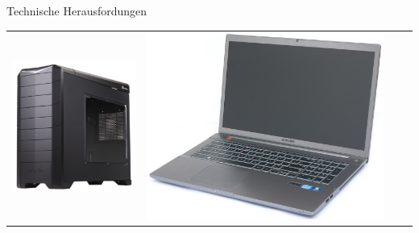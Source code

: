 \begin{frame}{Technische Herausfordungen}
\onetoone
{
	\begin{table}[h]
	\begin{tabular}{c|c|c|c}
		\includegraphics[width=\textwidth, height=0.1\textheight, keepaspectratio]{images/tower} &
		\includegraphics[width=\textwidth, height=0.1\textheight, keepaspectratio]{images/laptops} &

\end{tabular}
\end{table}}
\end{frame}
